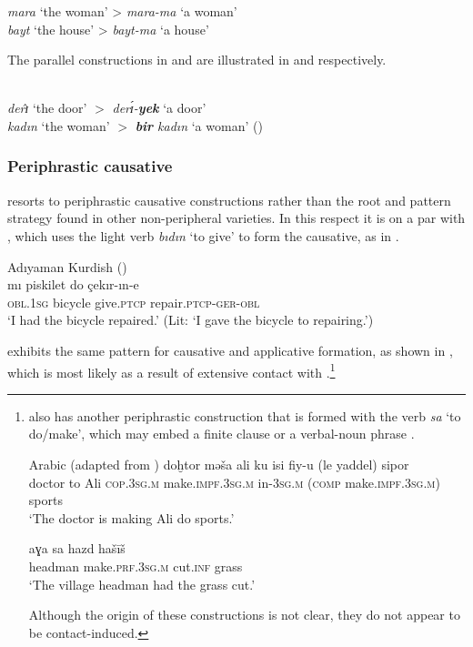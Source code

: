 \documentclass[output=paper]{langsci/langscibook}
\begin{document}
\textit{mara} `the woman' > \textit{mara-ma} `a woman' \\
\textit{bayt} `the house' > \textit{bayt-ma} `a house'
\z

\noindent The parallel constructions in  and  are illustrated in  and  respectively.

\begin{exe}
\ex \label{defkr} \\	\textit{derɪ}̂ `the door' 	$>$ \textit{derɪ́-\textbf{yek}} `a door'
\ex \label{deftk} \\	\textit{kadın} `the woman' $>$ \textit{\textbf{bir} kadın} `a woman' ()
\end{exe}


\subsubsection{Periphrastic causative}

  resorts to {periphrastic causative} constructions rather than the {root and pattern} strategy found in other non-peripheral  varieties. In this respect it is on a par with , which uses the {light verb} \textit{bıdın} ‘to give’ to form the {causative}, as in .
\begin{exe}
\ex \label{perrk}
{Adıyaman  Kurdish} (\citealt[62]{Atlamaz2012})\\
\gll  	mı         piskilet      	   do      	çekır-ın-e	\\
        \textsc{obl.1sg} bicycle  give.\textsc{ptcp}   repair.\textsc{ptcp-ger-obl}	 \\
        \glt `I had the bicycle repaired.' (Lit: `I gave the bicycle to repairing.')
\end{exe}

  exhibits the same pattern for {causative} and applicative {formation}, as shown in , which is most likely as a result of extensive contact with .\footnote{  also has another periphrastic construction that is formed with the verb \textit{sa} `to do/make', which may embed a finite clause  or a verbal-{noun phrase} .

\ea \label{make} { Arabic} (adapted from \citealt[221]{Taylan2017})
\ea
\label{makefin}  \gll doḫtor mə\v{s}a ali ku isi fiy-u (le yaddel) sipor \\
		doctor to Ali \textsc{cop.3sg.m} make.\textsc{impf.3sg.m} in-\textsc{3sg.m} (\textsc{comp} make.\textsc{impf.3sg.m}) sports\\\glt `The doctor is making Ali do sports.'

		\ex \label{makeinf} \gll aɣa sa hazd ha\v{s}ī\v{s}\\
		headman make.\textsc{prf.3sg.m} cut.\textsc{inf} grass  \\
		\glt 	`The village headman had the grass cut.'
\z
\z

\noindent Although the origin of these constructions is not clear, they do not appear to be contact-induced.}
\end{document}
